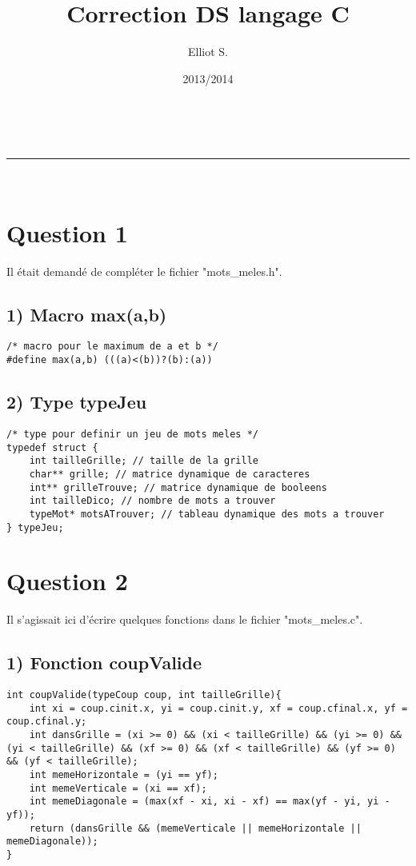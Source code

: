 \documentclass[a4paper,11pt]{article}
\makeatletter
\newcommand{\linia}{\rule{\linewidth}{0.5pt}}
\renewcommand{\maketitle}{
\begin{center}
\vspace{2ex}
{\huge \textsc{\@title}}
\vspace{1ex}
\\
\linia\\
\@author \hfill \@date
\vspace{4ex}
\end{center}
}
\makeatother
\begin{document}
\title{Correction DS langage C}

\author{Elliot S.}

\date{2013/2014}

\maketitle

\section*{Question 1}

Il était demandé de compléter le fichier "mots\_meles.h".

\subsection*{1) Macro max(a,b)}

\begin{lstlisting}[caption=La macro max]
/* macro pour le maximum de a et b */
#define max(a,b) (((a)<(b))?(b):(a))
\end{lstlisting}

\subsection*{2) Type typeJeu}

\begin{lstlisting}[caption=Le type typeJeu]
/* type pour definir un jeu de mots meles */
typedef struct {
	int tailleGrille; // taille de la grille
	char** grille; // matrice dynamique de caracteres
	int** grilleTrouve; // matrice dynamique de booleens
	int tailleDico; // nombre de mots a trouver
	typeMot* motsATrouver; // tableau dynamique des mots a trouver
} typeJeu;
\end{lstlisting}

\newpage{}

\section*{Question 2}

Il s'agissait ici d'écrire quelques fonctions dans le fichier "mots\_meles.c".

\subsection*{1) Fonction coupValide}
\begin{lstlisting}[caption=La fonction coupValide]
int coupValide(typeCoup coup, int tailleGrille){
	int xi = coup.cinit.x, yi = coup.cinit.y, xf = coup.cfinal.x, yf = coup.cfinal.y;
	int dansGrille = (xi >= 0) && (xi < tailleGrille) && (yi >= 0) && (yi < tailleGrille) && (xf >= 0) && (xf < tailleGrille) && (yf >= 0) && (yf < tailleGrille);
	int memeHorizontale = (yi == yf);
	int memeVerticale = (xi == xf);
	int memeDiagonale = (max(xf - xi, xi - xf) == max(yf - yi, yi - yf));
	return (dansGrille && (memeVerticale || memeHorizontale || memeDiagonale));
}
\end{lstlisting}
\end{document}
